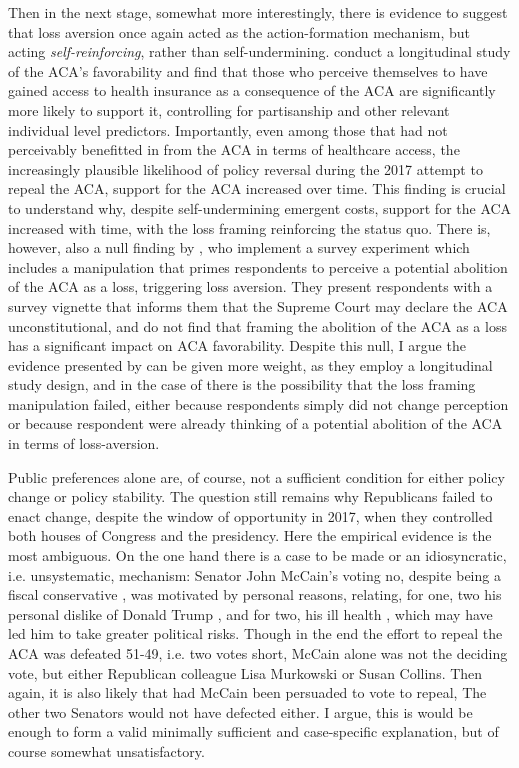 \documentclass[11pt]{article}
\begin{document}
Then in the next stage, somewhat more interestingly, there is evidence to suggest that loss aversion once again acted as the action-formation mechanism, but acting \textit{self-reinforcing}, rather than self-undermining. \textcite[][]{Mettler2022} conduct a longitudinal study of the ACA's favorability and find that those who perceive themselves to have gained access to health insurance as a consequence of the ACA are significantly more likely to support it, controlling for partisanship and other relevant individual level predictors. Importantly, even among those that had not perceivably benefitted in from the ACA in terms of healthcare access, the increasingly plausible likelihood of policy reversal during the 2017 attempt to repeal the ACA, support for the ACA increased over time. This finding is crucial to understand why, despite self-undermining emergent costs, support for the ACA increased with time, with the loss framing reinforcing the status quo. There is, however, also a null finding by \textcite[][]{Haeder2024}, who implement a survey experiment which includes a manipulation that primes respondents to perceive a potential abolition of the ACA as a loss, triggering loss aversion. They present respondents with a survey vignette that informs them that the Supreme Court may declare the ACA unconstitutional, and do not find that framing the abolition of the ACA as a loss has a significant impact on ACA favorability. Despite this null, I argue the evidence presented by \textcite[][]{Mettler2022} can be given more weight, as they employ a longitudinal study design, and in the case of \textcite[][]{Haeder2024} there is the possibility that the loss framing manipulation failed, either because respondents simply did not change perception or because respondent were already thinking of a potential abolition of the ACA in terms of loss-aversion.

Public preferences alone are, of course, not a sufficient condition for either policy change or policy stability. The question still remains why Republicans failed to enact change, despite the window of opportunity in 2017, when they controlled both houses of Congress and the presidency. Here the empirical evidence is the most ambiguous. On the one hand there is a case to be made or an idiosyncratic, i.e. unsystematic, mechanism: Senator John McCain's voting no, despite being a fiscal conservative \parencite[][]{McCain2008}, was motivated by personal reasons, relating, for one, two his personal dislike of Donald Trump \parencite[see e.g.][]{Everett2016}, and for two, his ill health \parencite[see][]{Davis2017}, which may have led him to take greater political risks. Though in the end the effort to repeal the ACA was defeated 51-49, i.e. two votes short, McCain alone was not the deciding vote, but either Republican colleague Lisa Murkowski or Susan Collins. Then again, it is also likely that had McCain been persuaded to vote to repeal, The other two Senators would not have defected either. I argue, this is would be enough to form a valid minimally sufficient and case-specific explanation, but of course somewhat unsatisfactory.
\end{document}
